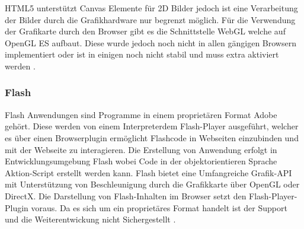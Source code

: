 HTML5   unterstützt Canvas Elemente für 2D Bilder jedoch ist eine Verarbeitung der Bilder durch die Grafikhardware nur begrenzt möglich.
Für die Verwendung der Grafikarte durch den Browser gibt es die Schnittstelle WebGL  welche auf OpenGL ES  aufbaut.
Diese wurde jedoch noch nicht in allen gängigen Browsern implementiert oder ist in einigen noch nicht stabil und muss extra aktiviert werden \cite{webgl-14}.


\subsubsection{Flash}
\label{sec:Flash}
Flash Anwendungen sind Programme in einem proprietären Format   Adobe gehört.
Diese werden von einem Interpreter\R{ (}dem Flash-Player\R{)} ausgeführt, welcher es über einen Browserplugin ermöglicht Flashcode in Webseiten einzubinden und mit der Webseite zu interagieren.
%
Die Erstellung von Anwendung erfolgt in Entwicklungsumgebung Flash  wobei Code in der objektorientieren Sprache Aktion-Script erstellt werden kann.
Flash bietet eine Umfangreiche   Grafik-API mit Unterstützung von Beschleunigung durch die Grafikkarte über OpenGL oder DirectX.
%
Die Darstellung von Flash-Inhalten im Browser setzt den  Flash-Player-Plugin voraus.
Da es sich um ein proprietäres Format handelt ist der Support und die Weiterentwickung nicht Sichergestellt  \cite{flash-14}.
